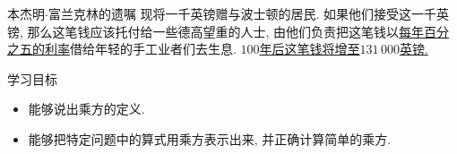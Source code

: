 \documentclass{beamer}
\begin{document}
\makeatletter
\renewcommand\normalsize{\@setfontsize\normalsize\@xpt\@xiipt\abovedisplayskip8\p@\@plus3\p@\@minus5\p@\abovedisplayshortskip\z@\@plus3\p@\belowdisplayshortskip5\p@\@plus3\p@\@minus7\p@\belowdisplayskip\abovedisplayskip\let\@listi\@listI}%
\makeatother
\begin{frame}{本杰明$\cdot$富兰克林的遗嘱}\Large\songti
  现将一千英镑赠与波士顿的居民.
  如果他们接受这一千英镑,
  那么这笔钱应该托付给一些德高望重的人士,
  由他们负责把这笔钱以\underline{每年百分之五的利率}借给年轻的手工业者们去生息.
  \underline{$100$年后这笔钱将增至$131\,000$英镑.}
\end{frame}

\begin{frame}{学习目标}
  \begin{block}{}
    \begin{itemize}
      \item 能够说出乘方的定义.\\\pause
      \item 能够把特定问题中的算式用乘方表示出来, 并正确计算简单的乘方.\\
    \end{itemize}
  \end{block}
\end{frame}
\end{document}

